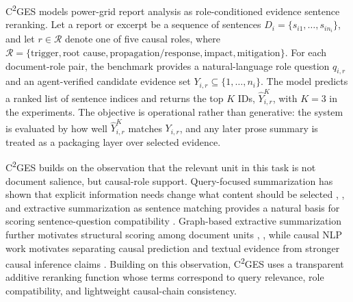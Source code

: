 \documentclass{ieeeaccess}
\begin{document}
\label{sec:problem_formulation_and_scoring_objectiv}

C\textsuperscript{2}GES models power-grid report analysis as role-conditioned evidence sentence reranking. Let a report or excerpt be a sequence of sentences \(D_i=\{s_{i1},\ldots,s_{in_i}\}\), and let \(r\in\mathcal{R}\) denote one of five causal roles, where \(\mathcal{R}=\{\text{trigger},\text{root cause},\text{propagation/response},\text{impact},\text{mitigation}\}\). For each document-role pair, the benchmark provides a natural-language role question \(q_{i,r}\) and an agent-verified candidate evidence set \(Y_{i,r}\subseteq \{1,\ldots,n_i\}\). The model predicts a ranked list of sentence indices and returns the top \(K\) IDs, \(\hat{Y}_{i,r}^{K}\), with \(K=3\) in the experiments. The objective is operational rather than generative: the system is evaluated by how well \(\hat{Y}_{i,r}^{K}\) matches \(Y_{i,r}\), and any later prose summary is treated as a packaging layer over selected evidence.

C\textsuperscript{2}GES builds on the observation that the relevant unit in this task is not document salience, but causal-role support. Query-focused summarization has shown that explicit information needs change what content should be selected \cite{zhong2021qmsum}, \cite{vig2022exploring}, and extractive summarization as sentence matching provides a natural basis for scoring sentence-question compatibility \cite{zhong2020extractive}. Graph-based extractive summarization further motivates structural scoring among document units \cite{wang2020heterogeneous}, \cite{jing2021multiplex}, while causal NLP work motivates separating causal prediction and textual evidence from stronger causal inference claims \cite{feder2022causal}. Building on this observation, C\textsuperscript{2}GES uses a transparent additive reranking function whose terms correspond to query relevance, role compatibility, and lightweight causal-chain consistency.
\end{document}
